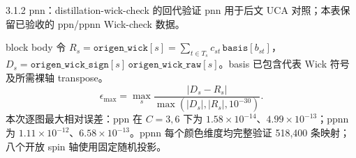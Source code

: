 \documentclass[aspectratio=169,UTF8,fontset=fandol]{ctexbeamer}
\newcommand{\smallnote}[1]{{\scriptsize\color{Muted}#1}}
\begin{document}
\begin{frame}{3.1.2 pnn：distillation-wick-check 的回代验证}
\centering
\scriptsize
\smallnote{pnn 用于后文 UCA 对照；本表保留已验收的 ppn/ppnn Wick-check 数据。}\par
\renewcommand{\arraystretch}{1.12}
\setlength{\tabcolsep}{4pt}
\vspace{0.35em}
\begin{beamercolorbox}[sep=0.5em,wd=\linewidth]{block body}
\scriptsize
令 \(R_s=\texttt{origen\_wick}[s]=\sum_{t\in T_s}c_{st}\,\texttt{basis}[b_{st}]\)，
\(D_s=\texttt{origen\_wick\_sign}[s]\,\texttt{origen\_wick\_raw}[s]\)。basis 已包含代表 Wick 符号及所需裸轴 transpose。\[
\epsilon_{\max}=\max_s\frac{|D_s-R_s|}{\max(|D_s|,|R_s|,10^{-30})}.
\]
本次逐图最大相对误差：ppn 在 \(C=3,6\) 下为 \(1.58\times10^{-14}\)、\(4.99\times10^{-13}\)；ppnn 为 \(1.11\times10^{-12}\)、\(6.58\times10^{-13}\)。ppnn 每个颜色维度均完整验证 518,400 条映射；八个开放 spin 轴使用固定随机投影。
\end{beamercolorbox}
\end{frame}
\end{document}

